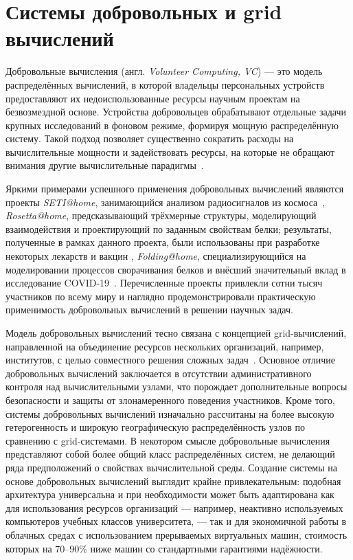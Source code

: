 \documentclass[a4paper,12pt]{extarticle}
\begin{document}
\section{Системы добровольных и grid вычислений}

Добровольные вычисления (англ. \textit{Volunteer Computing, VC}) — это модель распределённых вычислений, в которой владельцы персональных устройств предоставляют их недоиспользованные ресурсы научным проектам на безвозмездной основе.
Устройства добровольцев обрабатывают отдельные задачи крупных исследований в фоновом режиме, формируя мощную распределённую систему.
Такой подход позволяет существенно сократить расходы на вычислительные мощности и задействовать ресурсы, на которые не обращают внимания другие вычислительные парадигмы~\cite{anderson2020boinc}.

Яркими примерами успешного применения добровольных вычислений являются проекты
\textit{SETI@home}, занимающийся анализом радиосигналов из космоса~\cite{Anderson2002},
\textit{Rosetta@home}, предсказывающий трёхмерные структуры, моделирующий взаимодействия и проектирующий по заданным свойствам белки; результаты, полученные в рамках данного проекта, были использованы при разработке некоторых лекарств и вакцин \cite{RosettaHomeWiki},
\textit{Folding@home}, специализирующийся на моделировании процессов сворачивания белков и внёсший значительный вклад в исследование COVID-19~\cite{Zimmerman2021}.
Перечисленные проекты привлекли сотни тысяч участников по всему миру и наглядно продемонстрировали практическую применимость добровольных вычислений в решении научных задач.

Модель добровольных вычислений тесно связана с концепцией grid-вычислений, направленной на объединение ресурсов нескольких организаций, например, институтов, с целью совместного решения сложных задач~\cite{Foster2001}.
Основное отличие добровольных вычислений заключается в отсутствии административного контроля над вычислительными узлами, что порождает дополнительные вопросы безопасности и защиты от злонамеренного поведения участников.
Кроме того, системы добровольных вычислений изначально рассчитаны на более высокую гетерогенность и широкую географическую распределённость узлов по сравнению с grid-системами.
В некотором смысле добровольные вычисления представляют собой более общий класс распределённых систем, не делающий ряда предположений о свойствах вычислительной среды.
Создание системы на основе добровольных вычислений выглядит крайне привлекательным: подобная архитектура универсальна и при необходимости может быть адаптирована как для использования ресурсов организаций — например, неактивно используемых компьютеров учебных классов университета, — так и для экономичной работы в облачных средах с использованием прерываемых виртуальных машин, стоимость которых на 70–90\% ниже машин со стандартными гарантиями надёжности.
\end{document}

